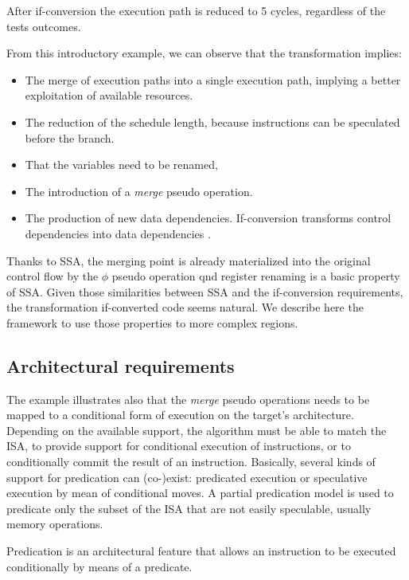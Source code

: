 After if-conversion the execution path is reduced to 5 cycles, regardless of the tests outcomes.

From this introductory example, we can observe that the transformation implies:

\begin{itemize}
\item The merge of execution paths into a single execution path, implying a  better exploitation of available resources.  
\item The reduction of the schedule length, because instructions can be speculated before the branch.
\item That the variables need to be renamed, 
\item The introduction of a \textit{merge} pseudo operation.
\item The production of new data dependencies. If-conversion transforms control dependencies into data dependencies \cite{Allen:1983:CCD:567067.567085}. 
\end{itemize}

Thanks to SSA, the merging point is already materialized into the original control flow by the $\phi$ pseudo operation qnd register renaming is a basic property of SSA. Given those similarities between SSA and the if-conversion requirements, the transformation if-converted code seems natural. We describe here the framework to use those properties to more complex regions.

\subsection{Architectural requirements}
The example illustrates also that the \textit{merge} pseudo operations needs to be mapped to a conditional form of execution on the target's architecture. Depending on the available support, the algorithm must be able to match the ISA, to provide support for conditional execution of instructions, or to conditionally commit the result of an instruction.
Basically, several kinds of support for predication can (co-)exist: predicated execution  or speculative execution by mean of conditional moves. A partial predication model is used to predicate only the subset of the ISA that are not easily speculable, usually memory operations.

Predication is an architectural feature that allows an instruction to be executed conditionally by means of a predicate.

